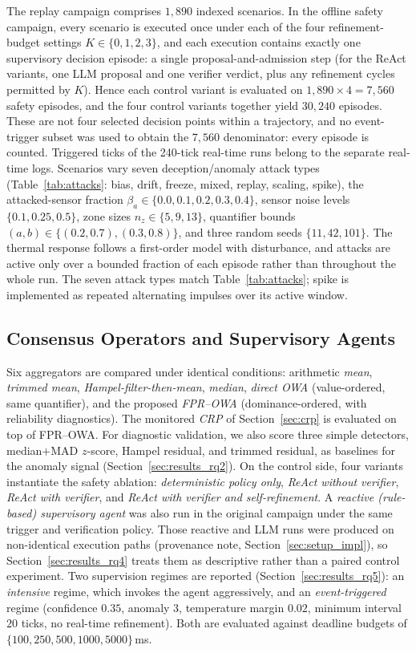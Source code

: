 \documentclass[smartcities,article,submit,moreauthors]{Definitions/mdpi}
\begin{document}
The replay campaign comprises $1{,}890$ indexed scenarios. In the offline
safety campaign, every scenario is executed once under each of the four
refinement-budget settings $K\in\{0,1,2,3\}$, and each execution contains
exactly one supervisory decision episode: a single proposal-and-admission
step (for the ReAct variants, one LLM proposal and one verifier verdict, plus
any refinement cycles permitted by $K$). Hence each control variant is
evaluated on $1{,}890\times4=7{,}560$ safety episodes, and the four control
variants together yield $30{,}240$ episodes. These are not four selected
decision points within a trajectory, and no event-trigger subset was used to
obtain the $7{,}560$ denominator: every episode is counted. Triggered ticks of
the 240-tick real-time runs belong to the separate real-time logs. Scenarios vary seven deception/anomaly attack types
(Table~\ref{tab:attacks}: bias, drift, freeze, mixed, replay, scaling,
spike), the attacked-sensor fraction $\beta_a\in\{0.0,0.1,0.2,0.3,0.4\}$,
sensor noise levels $\{0.1,0.25,0.5\}$, zone sizes
$n_z\in\{5,9,13\}$, quantifier bounds $(a,b)\in\{(0.2,0.7),(0.3,0.8)\}$,
and three random seeds $\{11,42,101\}$. The thermal response follows a
first-order model with disturbance, and attacks are active only over a
bounded fraction of each episode rather than throughout the whole run.
The seven attack types match Table~\ref{tab:attacks}; spike is implemented as
repeated alternating impulses over its active window.

\subsection{Consensus Operators and Supervisory Agents}
\label{sec:setup_methods}

Six aggregators are compared under identical conditions: arithmetic
\emph{mean}, \emph{trimmed mean}, \emph{Hampel-filter-then-mean},
\emph{median}, \emph{direct OWA} (value-ordered, same quantifier), and the
proposed \emph{FPR--OWA} (dominance-ordered, with reliability
diagnostics). The monitored \emph{CRP} of Section~\ref{sec:crp} is
evaluated on top of FPR--OWA. For diagnostic validation, we also score
three simple detectors, median$+$MAD $z$-score, Hampel residual, and
trimmed residual, as baselines for the anomaly signal
(Section~\ref{sec:results_rq2}). On the control side, four variants
instantiate the safety ablation: \emph{deterministic policy only},
\emph{ReAct without verifier}, \emph{ReAct with verifier}, and
\emph{ReAct with verifier and self-refinement}. A \emph{reactive
(rule-based) supervisory agent} was also run in the original campaign under
the same trigger and verification policy. Those reactive and LLM runs were
produced on non-identical execution paths (provenance note,
Section~\ref{sec:setup_impl}), so Section~\ref{sec:results_rq4} treats them
as descriptive rather than a paired control experiment. Two supervision
regimes are reported
(Section~\ref{sec:results_rq5}): an \emph{intensive} regime, which
invokes the agent aggressively, and an \emph{event-triggered} regime
(confidence $0.35$, anomaly $3$, temperature margin $0.02$, minimum
interval $20$ ticks, no real-time refinement). Both are evaluated against
deadline budgets of $\{100,250,500,1000,5000\}$\,ms.
\end{document}
